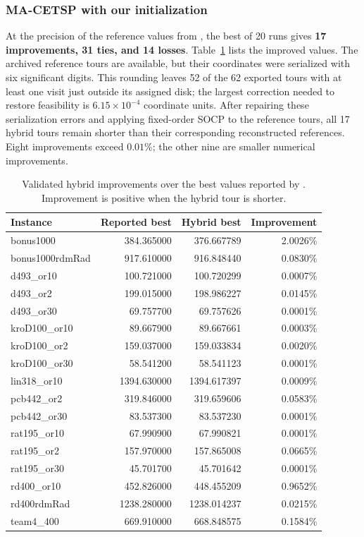 \documentclass[11pt]{article}
\begin{document}
\subsubsection{MA-CETSP with our initialization}

At the precision of the reference values from \textcite{LeiHao2024}, the best of 20 runs gives \textbf{17 improvements, 31 ties, and 14 losses}. Table~\ref{tab:hybrid-improvements} lists the improved values. The archived reference tours are available, but their coordinates were serialized with six significant digits. This rounding leaves 52 of the 62 exported tours with at least one visit just outside its assigned disk; the largest correction needed to restore feasibility is $6.15\times10^{-4}$ coordinate units. After repairing these serialization errors and applying fixed-order SOCP to the reference tours, all 17 hybrid tours remain shorter than their corresponding reconstructed references. Eight improvements exceed \(0.01\%\); the other nine are smaller numerical improvements.

\begin{table}[H]
\centering
\caption{Validated hybrid improvements over the best values reported by \textcite{LeiHao2024}. Improvement is positive when the hybrid tour is shorter.}
\label{tab:hybrid-improvements}
\begin{tabular}{lrrr}
\hline
Instance & Reported best & Hybrid best & Improvement \\
\hline
bonus1000 & 384.365000 & 376.667789 & 2.0026\% \\
bonus1000rdmRad & 917.610000 & 916.848440 & 0.0830\% \\
d493\_or10 & 100.721000 & 100.720299 & 0.0007\% \\
d493\_or2 & 199.015000 & 198.986227 & 0.0145\% \\
d493\_or30 & 69.757700 & 69.757626 & 0.0001\% \\
kroD100\_or10 & 89.667900 & 89.667661 & 0.0003\% \\
kroD100\_or2 & 159.037000 & 159.033834 & 0.0020\% \\
kroD100\_or30 & 58.541200 & 58.541123 & 0.0001\% \\
lin318\_or10 & 1394.630000 & 1394.617397 & 0.0009\% \\
pcb442\_or2 & 319.846000 & 319.659606 & 0.0583\% \\
pcb442\_or30 & 83.537300 & 83.537230 & 0.0001\% \\
rat195\_or10 & 67.990900 & 67.990821 & 0.0001\% \\
rat195\_or2 & 157.970000 & 157.865008 & 0.0665\% \\
rat195\_or30 & 45.701700 & 45.701642 & 0.0001\% \\
rd400\_or10 & 452.826000 & 448.455209 & 0.9652\% \\
rd400rdmRad & 1238.280000 & 1238.014237 & 0.0215\% \\
team4\_400 & 669.910000 & 668.848575 & 0.1584\% \\
\hline
\end{tabular}
\end{table}
\end{document}
